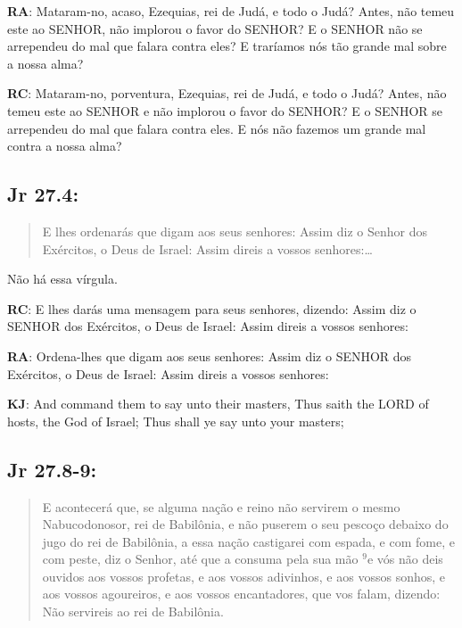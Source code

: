 \textbf{RA}: Mataram-no, acaso, Ezequias, rei de Judá, e todo o Judá? Antes, não temeu este ao SENHOR, não implorou o favor do SENHOR? E o SENHOR não se arrependeu do mal que falara contra eles? E traríamos nós tão grande mal sobre a nossa alma?

\textbf{RC}: Mataram-no, porventura, Ezequias, rei de Judá, e todo o Judá? Antes, não temeu este ao SENHOR e não implorou o favor do SENHOR? E o SENHOR se arrependeu do mal que falara contra eles. E nós não fazemos um grande mal contra a nossa alma?

\subsection*{Jr 27.4:} 
 \begin{quote}
  \small
 E lhes ordenarás\uwave{,} que digam aos seus senhores: Assim diz o Senhor dos Exércitos, o Deus de Israel: Assim direis a vossos senhores:\ldots
 \end{quote}
 
Não há essa vírgula.

\textbf{RC}: E lhes darás uma mensagem para seus senhores, dizendo: Assim diz o SENHOR dos Exércitos, o Deus de Israel: Assim direis a vossos senhores:

\textbf{RA}: Ordena-lhes que digam aos seus senhores: Assim diz o SENHOR dos Exércitos, o Deus de Israel: Assim direis a vossos senhores:

\textbf{KJ}: And command them to say unto their masters, Thus saith the LORD of hosts, the God of Israel; Thus shall ye say unto your masters;

\subsection*{Jr 27.8-9:} 
 \begin{quote}
  \small
 E acontecerá que, se alguma nação e reino não servirem o mesmo Nabucodonosor, rei de Babilônia, e não puserem o seu pescoço debaixo do jugo do rei de Babilônia, a essa nação castigarei com espada, e com fome, e com peste, diz o Senhor, até que a consuma pela sua mão\uwave{;} $^{\mathrm{9}}$e vós não deis ouvidos aos vossos profetas, e aos vossos adivinhos, e aos vossos sonhos, e aos vossos agoureiros, e aos vossos encantadores, que vos falam, dizendo: Não servireis ao rei de Babilônia.
 \end{quote}

